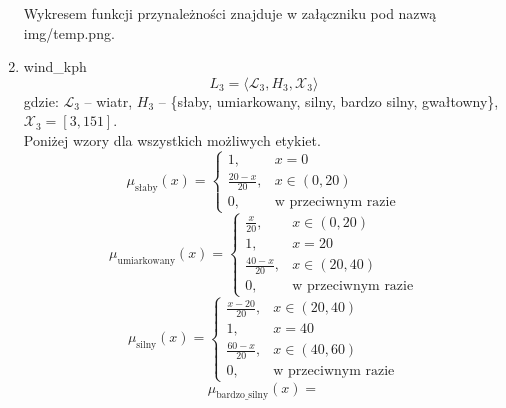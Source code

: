 \documentclass{article}
\begin{document}
\begin{enumerate}
Wykresem funkcji przynależności znajduje w załączniku pod nazwą img/temp.png.

    \item wind\_kph
        \begin{equation}
            L_3 = \langle \mathcal{L}_3, H_3, \mathcal{X}_3 \rangle
        \end{equation}
        gdzie: $\mathcal{L}_3$ – wiatr, $H_3$ – \{słaby, umiarkowany, silny, bardzo silny, gwałtowny\}, $\mathcal{X}_3 = [3, 151]$. \\
        Poniżej wzory dla wszystkich możliwych etykiet.
                  \begin{equation}
                    \mu_{\text{słaby}}(x) =
                    \begin{cases}
                    1, & x = 0 \\
                    \frac{20 - x}{20}, & x \in (0, 20) \\
                    0, & \text{w przeciwnym razie}
                    \end{cases}
                  \end{equation}
                \begin{equation}
                    \mu_{\text{umiarkowany}}(x) =
                    \begin{cases}
                    \frac{x}{20}, & x \in (0, 20) \\
                    1, & x = 20 \\
                    \frac{40 - x}{20}, & x \in (20, 40) \\
                    0, & \text{w przeciwnym razie}
                    \end{cases}
                  \end{equation}
                \begin{equation}
                    \mu_{\text{silny}}(x) =
                    \begin{cases}
                    \frac{x - 20}{20}, & x \in (20, 40) \\
                    1, & x = 40 \\
                    \frac{60 - x}{20}, & x \in (40, 60) \\
                    0, & \text{w przeciwnym razie}
                    \end{cases}
              \end{equation}
                \begin{equation}
                    \mu_{\text{bardzo\_silny}}(x) =

\end{equation}
\end{enumerate}
\end{document}

